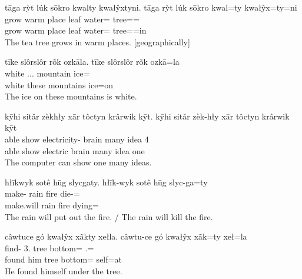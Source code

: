\documentclass[12pt]{article}
\begin{document}
    \begin{exe}
        \ex
        tāga rỳt lúk sōkro kwalty kwałŷxtyni.
        \glll
        tāga rỳt lúk sōkro kwal=ty kwałŷx=ty=ni \\
        grow warm place leaf water=\Poss{} tree=\Poss{}=\InessTwo{} \\
        grow warm place leaf water=\Poss{} tree=\Poss{}=in \\
        \glt
        The tea tree grows in warm places.
        [geographically]
    \end{exe}

    \begin{exe}
        \ex
        tīke slôrslôr rõk ozkāla.
        \glll
        tīke slôrslôr rõk ozkā=la \\
        white \Dem{}.\Inanim{}.\Prox{}.\Pl{} mountain ice=\AdessThree{} \\
        white these mountains ice=on \\
        \glt
        The ice on these mountains is white.
    \end{exe}

    \begin{exe}
        \ex
        kȳhi sitǎr zèkhły xār tôctyn krârwik kȳt.
        \glll
        kȳhi sitǎr zèk-hły xār tôctyn krârwik kȳt \\
        able show electricity-\Adj{} brain many idea 4\Sg{} \\
        able show electric brain many idea one \\
        \glt
        The computer can show one many ideas.
    \end{exe}

    \begin{exe}
        \ex
        hłīkwyk sotê hūg slycgaty.
        \glll
        hłīk-wyk sotê hūg slyc-ga=ty \\
        make-\Fut{} rain fire die-\Ger{}=\Poss{} \\
        make.will rain fire dying=\Poss{} \\
        \glt
        The rain will put out the fire.
        /
        The rain will kill the fire.
    \end{exe}

    \begin{exe}
        \ex
        câwtuce gó kwałŷx xãkty xełla.
        \glll
        câwtu-ce gó kwałŷx xãk=ty xeł=la \\
        find-\Pst{} 3\Sg{}.\Anim{} tree bottom=\Poss{} \Refl{}.\Sg{}=\AdessThree{} \\
        found him tree bottom=\Poss{} self=at \\
        \glt
        He found himself under the tree.
    \end{exe}
\end{document}

